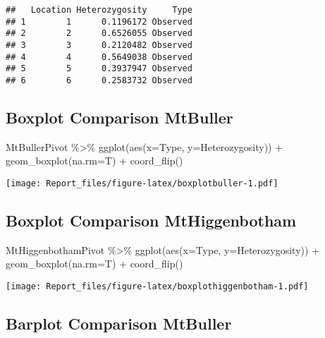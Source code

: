 \documentclass[
]{article}
\newenvironment{Shaded}{\begin{snugshade}}{\end{snugshade}}
\newcommand{\AttributeTok}[1]{\textcolor[rgb]{0.77,0.63,0.00}{#1}}
\newcommand{\FunctionTok}[1]{\textcolor[rgb]{0.00,0.00,0.00}{#1}}
\newcommand{\NormalTok}[1]{#1}
\newcommand{\SpecialCharTok}[1]{\textcolor[rgb]{0.00,0.00,0.00}{#1}}
\begin{document}
\begin{verbatim}
##   Location Heterozygosity     Type
## 1        1      0.1196172 Observed
## 2        2      0.6526055 Observed
## 3        3      0.2120482 Observed
## 4        4      0.5649038 Observed
## 5        5      0.3937947 Observed
## 6        6      0.2583732 Observed
\end{verbatim}

\hypertarget{boxplot-comparison-mtbuller}{%
\subsection{Boxplot Comparison
MtBuller}\label{boxplot-comparison-mtbuller}}

\begin{Shaded}
\begin{Highlighting}[]
\NormalTok{MtBullerPivot }\SpecialCharTok{\%\textgreater{}\%} 
  \FunctionTok{ggplot}\NormalTok{(}\FunctionTok{aes}\NormalTok{(}\AttributeTok{x=}\NormalTok{Type, }\AttributeTok{y=}\NormalTok{Heterozygosity)) }\SpecialCharTok{+} \FunctionTok{geom\_boxplot}\NormalTok{(}\AttributeTok{na.rm=}\NormalTok{T) }\SpecialCharTok{+} \FunctionTok{coord\_flip}\NormalTok{()}
\end{Highlighting}
\end{Shaded}

\texttt{[image: Report\_files/figure-latex/boxplotbuller-1.pdf]}

\hypertarget{boxplot-comparison-mthiggenbotham}{%
\subsection{Boxplot Comparison
MtHiggenbotham}\label{boxplot-comparison-mthiggenbotham}}

\begin{Shaded}
\begin{Highlighting}[]
\NormalTok{MtHiggenbothamPivot }\SpecialCharTok{\%\textgreater{}\%} 
  \FunctionTok{ggplot}\NormalTok{(}\FunctionTok{aes}\NormalTok{(}\AttributeTok{x=}\NormalTok{Type, }\AttributeTok{y=}\NormalTok{Heterozygosity)) }\SpecialCharTok{+} \FunctionTok{geom\_boxplot}\NormalTok{(}\AttributeTok{na.rm=}\NormalTok{T) }\SpecialCharTok{+} \FunctionTok{coord\_flip}\NormalTok{()}
\end{Highlighting}
\end{Shaded}

\texttt{[image: Report\_files/figure-latex/boxplothiggenbotham-1.pdf]}

\hypertarget{barplot-comparison-mtbuller}{%
\subsection{Barplot Comparison
MtBuller}\label{barplot-comparison-mtbuller}}
\end{document}
